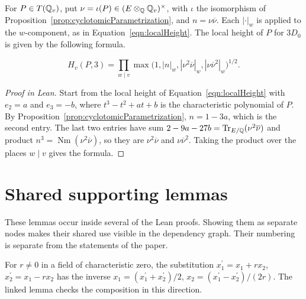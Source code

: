 \begin{equationnode}

\label{eqn:santensLocalHeight}


\leanok

For $P\in T(\mathbb{Q}_v)$, put $\nu=\iota(P)\in(E\otimes_{\mathbb{Q}}\mathbb{Q}_v)^\times$, with $\iota$ the isomorphism of Proposition~\ref{prop:cyclotomicParametrization}, and $n=\nu\overline\nu$. Each $|\cdot|_w$ is applied to the $w$-component, as in Equation~\ref{eqn:localHeight}. The local height of $P$ for $3D_0$ is given by the following formula.

\begin{equation*} H_v(P,3)=\prod_{w\mid v} \max\bigl(1,|n|_w,|\nu^2\overline\nu|_w, |\nu\overline\nu^2|_w\bigr)^{1/2}. \end{equation*}

\end{equationnode}

\begin{proof}[Proof in Lean]

\leanok


Start from the local height of Equation~\ref{eqn:localHeight} with $e_2=a$ and $e_3=-b$, where $t^3-t^2+at+b$ is the characteristic polynomial of $P$. By Proposition~\ref{prop:cyclotomicParametrization}, $n=1-3a$, which is the second entry. The last two entries have sum $2-9a-27b=\operatorname{Tr}_{E/\mathbb{Q}}(\nu^2\overline\nu)$ and product $n^3=\operatorname{Nm}(\nu^2\overline\nu)$, so they are $\nu^2\overline\nu$ and $\nu\overline\nu^2$. Taking the product over the places $w\mid v$ gives the formula.

\end{proof}

\chapter{Shared supporting lemmas}

These lemmas occur inside several of the Lean proofs. Showing them as separate nodes makes their shared use visible in the dependency graph. Their numbering is separate from the statements of the paper.

\begin{supportinglemma}

\label{helper:splittingCoordinates}


\leanok

For $r\ne0$ in a field of characteristic zero, the substitution $x_1^\prime=x_1+rx_2$, $x_2^\prime=x_1-rx_2$ has the inverse $x_1=(x_1^\prime+x_2^\prime)/2$, $x_2=(x_1^\prime-x_2^\prime)/(2r)$. The linked lemma checks the composition in this direction.

\end{supportinglemma}

